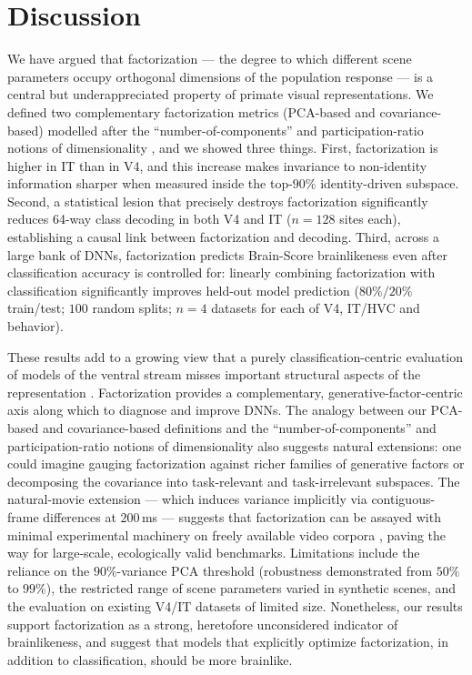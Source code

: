 \documentclass[11pt]{article}
\begin{document}
\section{Discussion}

We have argued that factorization --- the degree to which different scene parameters occupy orthogonal dimensions of the population response --- is a central but underappreciated property of primate visual representations. We defined two complementary factorization metrics (PCA-based and covariance-based) modelled after the ``number-of-components'' and participation-ratio notions of dimensionality \cite{gao2017theory,stringer2019high}, and we showed three things. First, factorization is higher in IT than in V4, and this increase makes invariance to non-identity information sharper when measured inside the top-$90\%$ identity-driven subspace. Second, a statistical lesion that precisely destroys factorization significantly reduces 64-way class decoding in both V4 and IT ($n = 128$ sites each), establishing a causal link between factorization and decoding. Third, across a large bank of DNNs, factorization predicts Brain-Score brainlikeness even after classification accuracy is controlled for: linearly combining factorization with classification significantly improves held-out model prediction ($80\%/20\%$ train/test; $100$ random splits; $n=4$ datasets for each of V4, IT/HVC and behavior).

These results add to a growing view that a purely classification-centric evaluation of models of the ventral stream misses important structural aspects of the representation \cite{schrimpf2020brainscore,conwell2022controlled,sorscher2022geometric}. Factorization provides a complementary, generative-factor-centric axis along which to diagnose and improve DNNs. The analogy between our PCA-based and covariance-based definitions and the ``number-of-components'' and participation-ratio notions of dimensionality \cite{gao2017theory,stringer2019high} also suggests natural extensions: one could imagine gauging factorization against richer families of generative factors or decomposing the covariance into task-relevant and task-irrelevant subspaces. The natural-movie extension --- which induces variance implicitly via contiguous-frame differences at $200$\,ms --- suggests that factorization can be assayed with minimal experimental machinery on freely available video corpora \cite{mit_moments2020,utaustin_egocentric}, paving the way for large-scale, ecologically valid benchmarks. Limitations include the reliance on the $90\%$-variance PCA threshold (robustness demonstrated from $50\%$ to $99\%$), the restricted range of scene parameters varied in synthetic scenes, and the evaluation on existing V4/IT datasets of limited size. Nonetheless, our results support factorization as a strong, heretofore unconsidered indicator of brainlikeness, and suggest that models that explicitly optimize factorization, in addition to classification, should be more brainlike.



\end{document}
